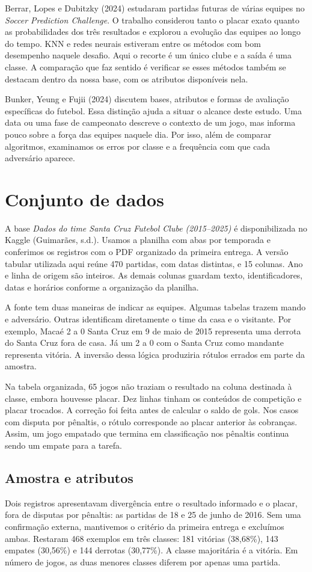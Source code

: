 \documentclass[12pt]{article}
\begin{document}
Berrar, Lopes e Dubitzky (2024) estudaram partidas futuras de várias equipes no \textit{Soccer Prediction Challenge}. O trabalho considerou tanto o placar exato quanto as probabilidades dos três resultados e explorou a evolução das equipes ao longo do tempo. KNN e redes neurais estiveram entre os métodos com bom desempenho naquele desafio. Aqui o recorte é um único clube e a saída é uma classe. A comparação que faz sentido é verificar se esses métodos também se destacam dentro da nossa base, com os atributos disponíveis nela.

Bunker, Yeung e Fujii (2024) discutem bases, atributos e formas de avaliação específicas do futebol. Essa distinção ajuda a situar o alcance deste estudo. Uma data ou uma fase de campeonato descreve o contexto de um jogo, mas informa pouco sobre a força das equipes naquele dia. Por isso, além de comparar algoritmos, examinamos os erros por classe e a frequência com que cada adversário aparece.
\section{Conjunto de dados}
A base \textit{Dados do time Santa Cruz Futebol Clube (2015--2025)} é disponibilizada no Kaggle (Guimarães, s.d.). Usamos a planilha com abas por temporada e conferimos os registros com o PDF organizado da primeira entrega. A versão tabular utilizada aqui reúne 470 partidas, com datas distintas, e 15 colunas. Ano e linha de origem são inteiros. As demais colunas guardam texto, identificadores, datas e horários conforme a organização da planilha.

A fonte tem duas maneiras de indicar as equipes. Algumas tabelas trazem mando e adversário. Outras identificam diretamente o time da casa e o visitante. Por exemplo, Macaé 2 a 0 Santa Cruz em 9 de maio de 2015 representa uma derrota do Santa Cruz fora de casa. Já um 2 a 0 com o Santa Cruz como mandante representa vitória. A inversão dessa lógica produziria rótulos errados em parte da amostra.

Na tabela organizada, 65 jogos não traziam o resultado na coluna destinada à classe, embora houvesse placar. Dez linhas tinham os conteúdos de competição e placar trocados. A correção foi feita antes de calcular o saldo de gols. Nos casos com disputa por pênaltis, o rótulo corresponde ao placar anterior às cobranças. Assim, um jogo empatado que termina em classificação nos pênaltis continua sendo um empate para a tarefa.
\clearpage
\subsection{Amostra e atributos}
Dois registros apresentavam divergência entre o resultado informado e o placar, fora de disputas por pênaltis: as partidas de 18 e 25 de junho de 2016. Sem uma confirmação externa, mantivemos o critério da primeira entrega e excluímos ambas. Restaram 468 exemplos em três classes: 181 vitórias (38,68\%), 143 empates (30,56\%) e 144 derrotas (30,77\%). A classe majoritária é a vitória. Em número de jogos, as duas menores classes diferem por apenas uma partida.
\end{document}
